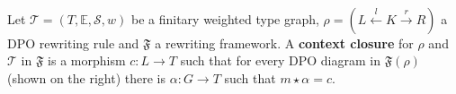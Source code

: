 \begin{definition}
    \label{def:context_closure}  
    \ \newline 
\begin{minipage}{0.65\textwidth}
    Let $\mathcal{T}=(T,\mathbb{E},\mathcal{S},w)$ be a finitary weighted type graph, \(\rho = (L \overset{l}{\leftarrow} K \overset{r}{\rightarrow} R ) \) a DPO rewriting rule and $\mathfrak{F}$ a rewriting framework. 
    A \textbf{context closure} for $\rho$ and $\mathcal{T}$ in $\mathfrak{F}$ is a morphism $c:L \rightarrow T$ such that for every DPO diagram in $\mathfrak{F}(\rho)$ (shown on the right) 
    there is $\alpha : G \rightarrow T$ such that $m \star \alpha = c$.
\end{minipage}
\begin{minipage}{0.35\textwidth}
    \begin{center}
      \end{center}
\end{minipage}
\end{definition}
